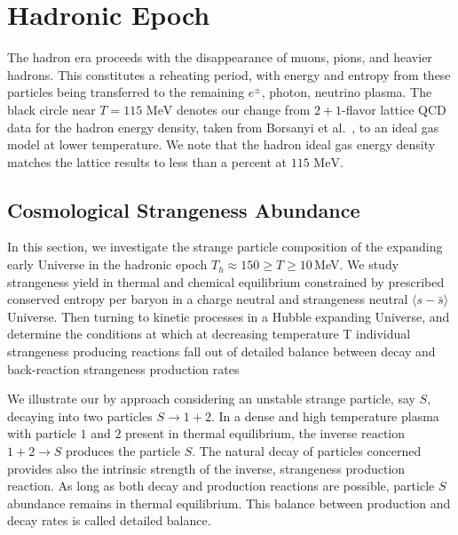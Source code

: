 \documentclass[Universe,article,submit,moreauthors,pdftex]{Definitions/mdpi}
\newcommand{\MeV}{\text{ MeV}}
\begin{document}
\section{Hadronic Epoch}\label{sec:Hadrons}
The hadron era proceeds with the disappearance of muons, pions, and heavier hadrons.  This constitutes a reheating period, with energy and entropy from these particles being transferred to the remaining $e^\pm$, photon, neutrino plasma.   The black circle near $T=115\MeV$ denotes our change from $2+1$-flavor lattice QCD data for the hadron energy density, taken from Borsanyi et al.~\cite{Borsanyi:2013bia}, to an ideal gas model at lower temperature.  We note that the hadron ideal gas energy density matches the lattice results to less than a percent at $115\MeV$.
\subsection{Cosmological Strangeness Abundance}\label{subsec:Strangeness}
In this section, we investigate the strange particle composition of the expanding early Universe in the hadronic epoch $T_h\approx 150\ge T\ge 10$\,MeV. We study strangeness yield in thermal and chemical equilibrium constrained by prescribed conserved entropy per baryon in a charge neutral and strangeness neutral $\langle s-\bar s\rangle$ Universe. Then turning to kinetic processes in a Hubble expanding Universe, and determine the
conditions at which at decreasing temperature T individual strangeness producing reactions fall out of detailed balance between decay and back-reaction strangeness production rates

We illustrate our by approach considering an unstable strange particle, say $S$, decaying into two particles $S\rightarrow 1+2$. In a dense and high temperature plasma with particle $1$ and $2$ present in thermal equilibrium, the inverse reaction $1+2\rightarrow S$ produces the particle $S$. The natural decay of particles concerned provides also the intrinsic strength of the inverse, strangeness production reaction. As long as both decay and production reactions are possible, particle $S$ abundance remains in thermal equilibrium. This balance between production and decay rates is called detailed balance. 
\end{document}
